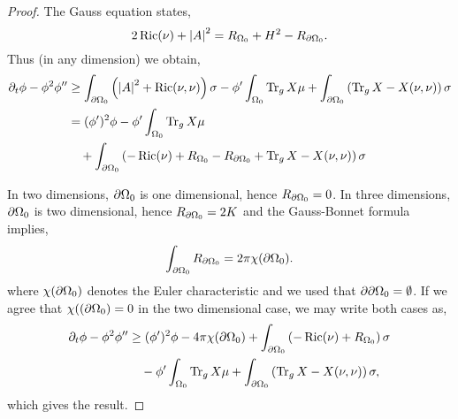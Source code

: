 \documentclass{amsart}
\begin{document}
\begin{proof}
The Gauss equation states,
\[
2 \operatorname{Ric}(\nu) + \left|{A}\right|^2 = R_{\Omega_0} + H^2 - R_{\partial {\Omega_0}}.
\]
Thus (in any dimension) we obtain,
\[
\begin{split}
\partial_t \phi - \phi^2 \phi'' &\geq \int_{\partial {\Omega_0}} \left(\left|{A}\right|^2 + \operatorname{Ric}(\nu, \nu)\right) \sigma  - \phi'\int_{\Omega_0} \operatorname{Tr}_g X \mu + \int_{\partial {\Omega_0}} \left(\operatorname{Tr}_g X - X(\nu, \nu)\right) \sigma \\
&= (\phi')^2 \phi - \phi'\int_{\Omega_0} \operatorname{Tr}_g X \mu \\
&\quad + \int_{\partial {\Omega_0}} \left(-\operatorname{Ric}(\nu) + R_{\Omega_0} - R_{\partial {\Omega_0}} + \operatorname{Tr}_g X - X(\nu, \nu)\right) \sigma
\end{split}
\]

In two dimensions, \(\partial {\Omega_0}\) is one dimensional, hence \(R_{\partial {\Omega_0}} = 0\). In three dimensions, \(\partial {\Omega_0}\) is two dimensional, hence \(R_{\partial {\Omega_0}} = 2K\) and the Gauss-Bonnet formula implies,
\[
\int_{\partial {\Omega_0}} R_{\partial {\Omega_0}} = 2\pi \chi(\partial {\Omega_0}).
\]
where \(\chi(\partial {\Omega_0})\) denotes the Euler characteristic and we used that \(\partial {\partial {\Omega_0}} = \emptyset\). If we agree that \(\chi((\partial {\Omega_0}) = 0\) in the two dimensional case, we may write both cases as,
\[
\begin{split}
\partial_t \phi - \phi^2 \phi'' &\geq (\phi')^2 \phi - 4\pi \chi(\partial {\Omega_0}) + \int_{\partial {\Omega_0}} \left(-\operatorname{Ric}(\nu) + R_{\Omega_0} \right)\sigma \\
&\quad - \phi'\int_{\Omega_0} \operatorname{Tr}_g X \mu + \int_{\partial {\Omega_0}} \left(\operatorname{Tr}_g X - X(\nu, \nu)\right) \sigma,
\end{split}
\]
which gives the result.
\end{proof}

\printbibliography
\end{document}
